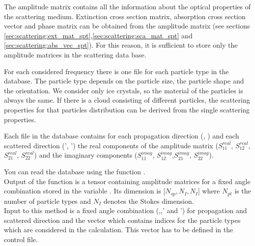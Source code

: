 The amplitude matrix contains all the information about the optical
properties of the scattering medium. Extinction cross section
matrix, absorption cross section vector and phase matrix can be
obtained from the amplitude matrix (see sections
\ref{sec:scattering:ext_mat_spt},\ref{sec:scattering:sca_mat_spt}  and
\ref{sec:scattering:abs_vec_spt}).
For this reason, it is sufficient to store only the amplitude matrices
in the scattering data base. 


For each considered frequency there is one file for each particle
type in the database. The particle
type depends on the particle size, the particle shape and the
orientation. We consider only ice crystals, so the material of the
particles is always the same. If there is a cloud consisting of
different particles, the scattering properties for that particles
distribution can be derived from the single scattering properties.

Each file in the database contains for each propagation direction (\ScaZa,
\ScaAa) and each scattered direction (\ScaZa', \ScaAa') the real
components of the amplitude matrix ($S^{real}_{11}$, $S^{real}_{12}$,
$S^{real}_{21}$, $S^{real}_{22}$) and the imaginary components
($S^{imag}_{11}$, $S^{imag}_{12}$,$S^{imag}_{21}$, $S^{imag}_{22}$).

You can read the database using the function
.\\
Output of the function is a tensor containing amplitude matrices for
a fixed angle combination stored in the variable
. Its dimension is [$N_{sp}, N_{I}, N_{I}$]
where $N_{pt}$ is the number of particle
types  and $N_{I}$ denotes the Stokes dimension.\\
Input to this method is a fixed angle
combination  (,,' and
') for propagation and scattered direction and the vector
 which contains indices for the  particle types
which are considered in the calculation. This vector has to be defined
in the control file.


\label{sec:scattering:gen_atmprop}

\label{sec:scattering:gen_ext}

